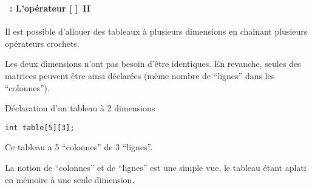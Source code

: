 \begin{frame}[containsverbatim]
  \frametitle{\secname}
  \framesubtitle{\subsecname~: L'opérateur [ ]~II}

  Il est possible d'allouer des tableaux à plusieurs dimensions en chainant plusieurs opérateurs crochets.
  \vspace{0.3cm}
  \par
  Les deux dimensions n'ont pas besoin d'être identiques. En revanche, seules des matrices peuvent être ainsi déclarées (même nombre 
  de ``lignes'' dans les ``colonnes'').
  \begin{exampleblock}{Déclaration d'un tableau à 2 dimensions}
    \begin{verbatim}
int table[5][3];\end{verbatim}    
  \end{exampleblock}
  Ce tableau a 5 ``colonnes'' de 3 ``lignes''. 
  \vspace{0.3cm}
  \par
  La notion de ``colonnes'' et de ``lignes'' est une simple vue, le tableau étant aplati en 
  mémoire à une seule dimension.
\end{frame}

